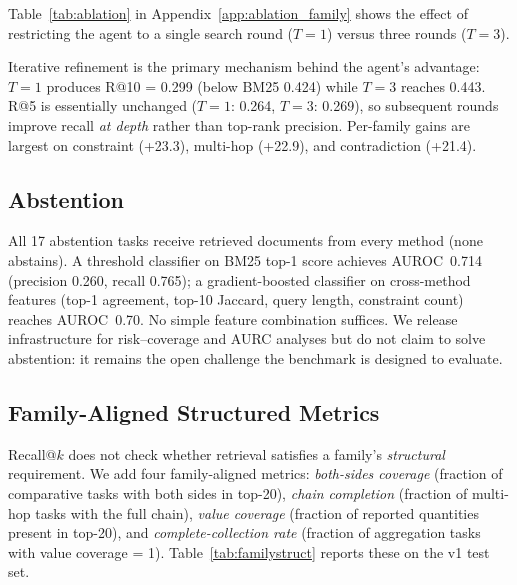 \documentclass{article}
\begin{document}
Table~\ref{tab:ablation} in Appendix~\ref{app:ablation_family} shows the effect of restricting the agent to a single search round ($T{=}1$) versus three rounds ($T{=}3$).

Iterative refinement is the primary mechanism behind the agent's advantage: $T{=}1$ produces R@10 = 0.299 (below BM25 0.424) while $T{=}3$ reaches 0.443. R@5 is essentially unchanged ($T{=}1$: 0.264, $T{=}3$: 0.269), so subsequent rounds improve recall \emph{at depth} rather than top-rank precision. Per-family gains are largest on constraint (+23.3), multi-hop (+22.9), and contradiction (+21.4).

\subsection{Abstention}

All 17 abstention tasks receive retrieved documents from every method (none abstains). A threshold classifier on BM25 top-1 score achieves AUROC~0.714 (precision 0.260, recall 0.765); a gradient-boosted classifier on cross-method features (top-1 agreement, top-10 Jaccard, query length, constraint count) reaches AUROC~0.70. No simple feature combination suffices. We release infrastructure for risk--coverage and AURC analyses but do not claim to solve abstention: it remains the open challenge the benchmark is designed to evaluate.

\subsection{Family-Aligned Structured Metrics}
\label{sec:familystruct}

Recall@$k$ does not check whether retrieval satisfies a family's \emph{structural} requirement. We add four family-aligned metrics: \emph{both-sides coverage} (fraction of comparative tasks with both sides in top-20), \emph{chain completion} (fraction of multi-hop tasks with the full chain), \emph{value coverage} (fraction of reported quantities present in top-20), and \emph{complete-collection rate} (fraction of aggregation tasks with value coverage = 1). Table~\ref{tab:familystruct} reports these on the v1 test set.
\end{document}
